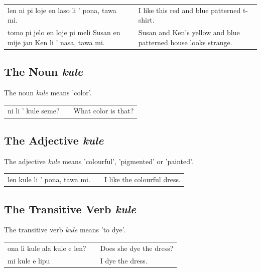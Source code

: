 \begin{supertabular}{p{5,5cm}|ll}
len ni pi loje en laso li ' pona, tawa mi. && I like this red and blue patterned t-shirt. \\
tomo pi jelo en loje pi meli Susan en mije jan Ken li ' nasa, tawa mi. &&  Susan and Ken's yellow and blue patterned house looks strange. \\
\end{supertabular} 

%
\subsection*{The Noun \textit{kule}}
%
%
The noun \textit{kule} means 'color'. 

\begin{supertabular}{p{5,5cm}|ll}
ni li ' kule seme? && What color is that? \\
\end{supertabular} 

%
\subsection*{The Adjective \textit{kule}}
%
%
The adjective \textit{kule} means 'colourful', 'pigmented' or 'painted'.

\begin{supertabular}{p{5,5cm}|ll}
len kule li ' pona, tawa mi. && I like the colourful dress. \\
\end{supertabular}

%
\subsection*{The Transitive Verb \textit{kule}}
%
%
The transitive verb \textit{kule} means 'to dye'. 

\begin{supertabular}{p{5,5cm}|ll}
ona li kule ala kule e len? && Does she dye the dress? \\
mi kule e lipu && I dye the dress. \\
\end{supertabular} 

